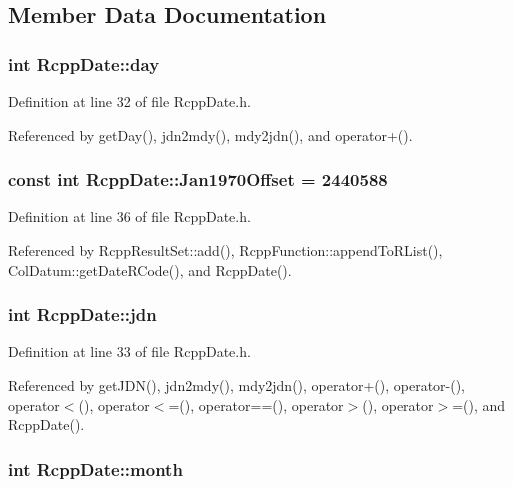 \subsection{Member Data Documentation}
\hypertarget{classRcppDate_a9e6aec176d9432829a304550eadd4205}{
\subsubsection[{day}]{\setlength{\rightskip}{0pt plus 5cm}int {\bf RcppDate::day}}}
\label{classRcppDate_a9e6aec176d9432829a304550eadd4205}


Definition at line 32 of file RcppDate.h.

Referenced by getDay(), jdn2mdy(), mdy2jdn(), and operator+().\hypertarget{classRcppDate_a44b0643ab19489a0fb9700d25f504902}{
\subsubsection[{Jan1970Offset}]{\setlength{\rightskip}{0pt plus 5cm}const int {\bf RcppDate::Jan1970Offset} = 2440588}}
\label{classRcppDate_a44b0643ab19489a0fb9700d25f504902}


Definition at line 36 of file RcppDate.h.

Referenced by RcppResultSet::add(), RcppFunction::appendToRList(), ColDatum::getDateRCode(), and RcppDate().\hypertarget{classRcppDate_ab883f696379dd06e39c6c9b3502a2164}{
\subsubsection[{jdn}]{\setlength{\rightskip}{0pt plus 5cm}int {\bf RcppDate::jdn}}}
\label{classRcppDate_ab883f696379dd06e39c6c9b3502a2164}


Definition at line 33 of file RcppDate.h.

Referenced by getJDN(), jdn2mdy(), mdy2jdn(), operator+(), operator-\/(), operator$<$(), operator$<$=(), operator==(), operator$>$(), operator$>$=(), and RcppDate().\hypertarget{classRcppDate_a00bf3ece7320d63aee4f6b6df82b4f63}{
\subsubsection[{month}]{\setlength{\rightskip}{0pt plus 5cm}int {\bf RcppDate::month}}}
\label{classRcppDate_a00bf3ece7320d63aee4f6b6df82b4f63}


